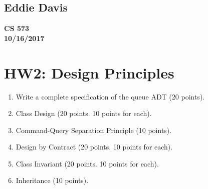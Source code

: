 \documentclass{report}
\begin{document}
\subsection*{Eddie Davis}
\textbf{CS 573}\\
\textbf{10/16/2017}\\

\section*{HW2: Design Principles}

\begin{enumerate}
	\item Write a complete specification of the queue ADT (20 points).

	\item Class Design (20 points. 10 points for each).

	\item Command-Query Separation Principle (10 points).
	
	\item Design by Contract  (20 points. 10 points for each).
	
	\item Class Invariant  (20 points. 10 points for each).
	
    \item Inheritance (10 points).

\end{enumerate}
\end{document}
